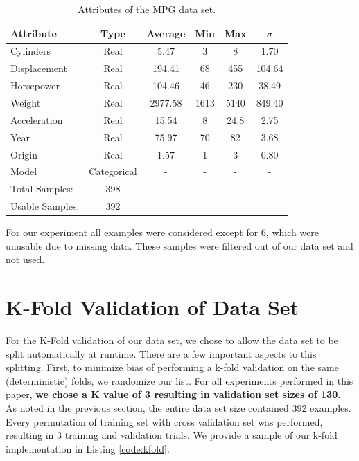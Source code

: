 \documentclass[letterpaper,12pt]{article}
\begin{document}
\begin{table}[H]
  \centering
\begin{tabular}{ | l | c | c | c | c | c |}
  \hline
  Attribute & Type & Average & Min & Max & $\sigma$ \\
  \hline
  \hline
  Cylinders & Real  &  5.47 & 3 & 8 & 1.70 \\
  \hline
Displacement & Real  &  194.41 & 68 & 455 & 104.64 \\
  \hline
Horsepower & Real  &  104.46 & 46 & 230 & 38.49 \\
  \hline
Weight & Real  &  2977.58 & 1613 & 5140 & 849.40 \\
  \hline
Acceleration & Real  &  15.54 & 8 & 24.8 & 2.75 \\
  \hline
Year & Real  &  75.97 & 70 & 82 & 3.68 \\
  \hline
Origin & Real  &  1.57 & 1 & 3 & 0.80 \\
  \hline
  Model & Categorical  &  - & -  & -  & - \\
  \hline
  Total Samples: & 398 & & & & \\
  \hline
  Usable Samples: & 392 & & & & \\
  \hline
\end{tabular}
\caption{Attributes of the MPG data set.}
\label{table:dataset}
\end{table}

For our experiment all examples were considered except for 6, which were unusable due to missing data. These samples were filtered out of our data set and not used. 

\section{K-Fold Validation of Data Set}

For the K-Fold validation of our data set, we chose to allow the data set to be split automatically at runtime. There are a few important aspects to this splitting. First, to minimize bias of performing a k-fold validation on the same (deterministic) folds, we randomize our list. For all experiments performed in this paper, \textbf{we chose a K value of 3 resulting in validation set sizes of 130.} As noted in the previous section, the entire data set size contained 392 examples. Every permutation of training set with cross validation set was performed, resulting in 3 training and validation trials. We provide a sample of our k-fold implementation in Listing \ref{code:kfold}.
\end{document}

